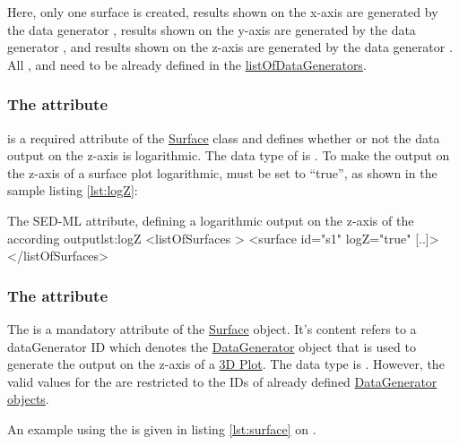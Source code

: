 Here, only one surface is created, results shown on the x-axis are generated by the data generator , results shown on the y-axis are generated by the data generator , and results shown on the z-axis are generated by the data generator . All ,  and  need to be already defined in the \hyperref[sec:listOfDataGenerators]{listOfDataGenerators}.


\subsubsection{The  attribute}
\label{sec:logZ}
 is a required attribute of the \hyperref[class:surface]{Surface} class and defines whether or not the data output on the z-axis is logarithmic. The data type of  is .
To make the output on the z-axis of a surface plot logarithmic,  must be set to ``true'', as shown in the sample listing \ref{lst:logZ}: 
\begin{myXmlLst}{The SED-ML  attribute, defining a logarithmic output on the z-axis of the according output}{lst:logZ}
<listOfSurfaces >
  <surface id="s1" logZ="true" [..]>
</listOfSurfaces>
\end{myXmlLst}

\subsubsection{The  attribute}
\label{sec:zDataReference}
The  is a mandatory attribute of the \hyperref[class:surface]{Surface} object. It's content refers to a dataGenerator ID which denotes the \hyperref[class:dataGenerator]{DataGenerator} object that is used to generate the output on the z-axis of a \hyperref[class:plot3D]{3D Plot}.
The  data type is . However, the valid values for the  are restricted to the IDs of already defined \hyperref[class:dataGenerator]{DataGenerator objects}.

An example using the  is given in listing \ref{lst:surface} on .
